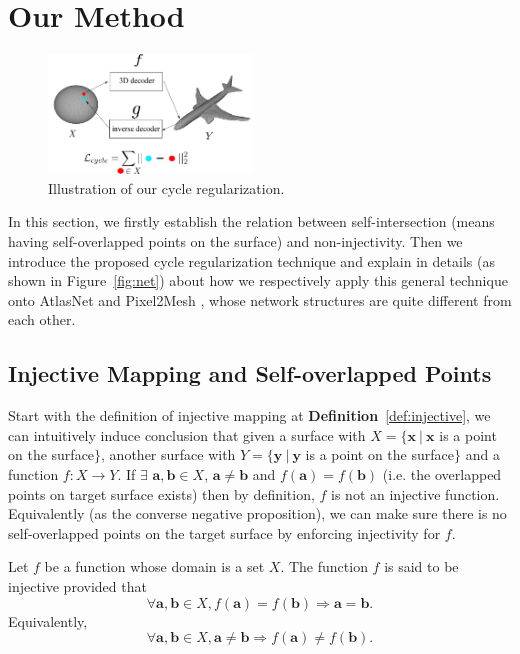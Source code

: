 \section{Our Method}
\begin{figure}
	\vspace{-20pt}
	\begin{center}
		\includegraphics[width=0.48\textwidth]{img/net/cycle}
	\end{center}
	\caption{Illustration of our cycle regularization.}
	\label{fig:cycle}
\end{figure}
In this section, we firstly establish the relation between self-intersection (means having self-overlapped points on the surface) and non-injectivity.  
Then we introduce the proposed cycle regularization technique and explain in details (as shown in Figure~\ref{fig:net}) about how we respectively apply this general technique onto AtlasNet \cite{atlasnet} and Pixel2Mesh \cite{pixel2mesh}, whose network structures are quite different from each other.

\subsection{Injective Mapping and Self-overlapped Points}
\label{subsec:inj}
Start with the definition of injective mapping at \textbf{Definition}~\ref{def:injective}, we can intuitively induce conclusion that given a surface with $X =\{\mathbf{x}~|~\mathbf{x}$ is a point on the surface$\} $, another surface with $ Y =\{\mathbf{y}~|~\mathbf{y}$ is a point on the surface$\}$ and a function $f:X \rightarrow Y$. If $\exists$ $ \mathbf{a},\mathbf{b} \in X$, $\mathbf{a} \neq \mathbf{b}$ and $f(\mathbf{a}) = f(\mathbf{b})$ (i.e. the overlapped points on target surface exists) then by definition, $f$ is not an injective function. Equivalently (as the converse negative proposition), we can make sure there is no self-overlapped points on the target surface by enforcing injectivity for $f$.
\begin{m_def}
\label{def:injective}
Let $f$ be a function whose domain is a set $X$. The function $f$ is said to be injective provided that
\begin{equation}
\forall \mathbf{a},\mathbf{b} \in X, f(\mathbf{a}) = f(\mathbf{b}) \Rightarrow \mathbf{a} = \mathbf{b}.
\end{equation}
Equivalently, 
\begin{equation}
\forall \mathbf{a},\mathbf{b} \in X, \mathbf{a} \neq \mathbf{b} \Rightarrow f(\mathbf{a}) \neq f(\mathbf{b}).
\end{equation}
\end{m_def}

